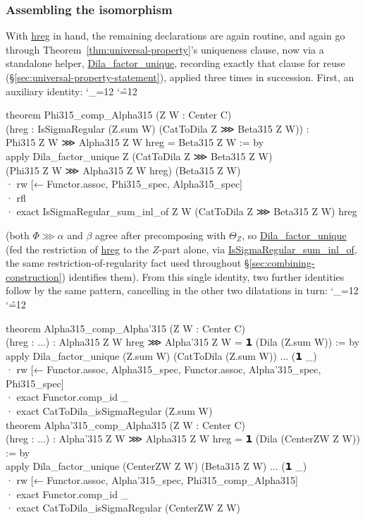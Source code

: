 \documentclass[11pt]{amsart}
\newcommand{\lc}[1]{\url{#1}}
\newenvironment{leancode}{%
  \begingroup
  \catcode`\_=12\relax
  \catcode`\^=12\relax
  \small\ttfamily\raggedright\baselineskip=1.15\baselineskip
  \par\smallskip\noindent
}{%
  \par\smallskip
  \endgroup
}
\theoremstyle{plain}
\theoremstyle{definition}
\theoremstyle{remark}
\begin{document}
\subsubsection*{Assembling the isomorphism}
With \lc{hreg} in hand, the remaining declarations are again routine, and again go through
Theorem~\ref{thm:universal-property}'s uniqueness clause, now via a standalone helper,
\lc{Dila_factor_unique}, recording exactly that clause for reuse (\S\ref{sec:universal-property-statement}), applied three times in succession. First, an auxiliary identity:
\begin{leancode}
theorem Phi315_comp_Alpha315 (Z W : Center C) \\
    (hreg : IsSigmaRegular (Z.sum W) (CatToDila Z ⋙ Beta315 Z W)) : \\
    Phi315 Z W ⋙ Alpha315 Z W hreg = Beta315 Z W := by \\
  apply Dila_factor_unique Z (CatToDila Z ⋙ Beta315 Z W) \\
    (Phi315 Z W ⋙ Alpha315 Z W hreg) (Beta315 Z W) \\
  · rw [← Functor.assoc, Phi315_spec, Alpha315_spec] \\
  · rfl \\
  · exact IsSigmaRegular_sum_inl_of Z W (CatToDila Z ⋙ Beta315 Z W) hreg \\
\end{leancode}
(both $\Phi\ggg\alpha$ and $\beta$ agree after precomposing with $\Theta_Z$, so
\lc{Dila_factor_unique} (fed the restriction of \lc{hreg} to the $Z$-part alone, via
\lc{IsSigmaRegular_sum_inl_of}, the same restriction-of-regularity fact used throughout
\S\ref{sec:combining-construction}) identifies them). From this single identity, two
further identities follow by the same pattern, cancelling in the other two dilatations
in turn:
\begin{leancode}
theorem Alpha315_comp_Alpha'315 (Z W : Center C) \\
    (hreg : ...) : Alpha315 Z W hreg ⋙ Alpha'315 Z W = 𝟭 (Dila (Z.sum W)) := by \\
  apply Dila_factor_unique (Z.sum W) (CatToDila (Z.sum W)) ... (𝟭 _) \\
  · rw [← Functor.assoc, Alpha315_spec, Functor.assoc, Alpha'315_spec, Phi315_spec] \\
  · exact Functor.comp_id _ \\
  · exact CatToDila_isSigmaRegular (Z.sum W) \\[0.5\baselineskip]
theorem Alpha'315_comp_Alpha315 (Z W : Center C) \\
    (hreg : ...) : Alpha'315 Z W ⋙ Alpha315 Z W hreg = 𝟭 (Dila (CenterZW Z W)) := by \\
  apply Dila_factor_unique (CenterZW Z W) (Beta315 Z W) ... (𝟭 _) \\
  · rw [← Functor.assoc, Alpha'315_spec, Phi315_comp_Alpha315] \\
  · exact Functor.comp_id _ \\
  · exact CatToDila_isSigmaRegular (CenterZW Z W) \\
\end{leancode}
\end{document}
